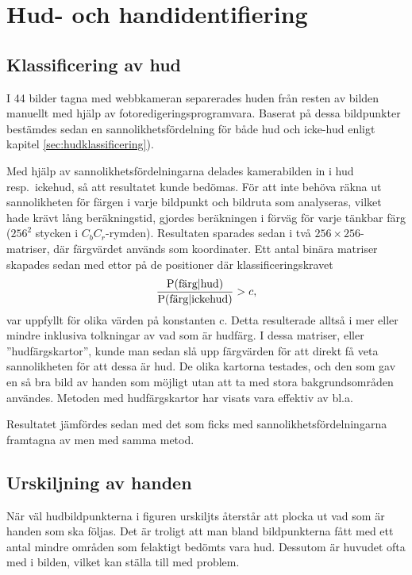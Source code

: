 \section{Hud- och handidentifiering}

\subsection{Klassificering av hud}
I 44 bilder tagna med webbkameran separerades huden från resten av
bilden manuellt med hjälp av fotoredigeringsprogramvara. Baserat på
dessa bildpunkter bestämdes sedan en sannolikhetsfördelning för både hud
och icke-hud enligt kapitel \ref{sec:hudklassificering}). 

Med hjälp av
sannolikhetsfördelningarna delades kamerabilden in i hud
resp.~ickehud, så att resultatet kunde bedömas. För att inte behöva
räkna ut sannolikheten för färgen i varje bildpunkt och bildruta
som analyseras,
vilket hade krävt lång beräkningstid, gjordes beräkningen
i förväg för varje tänkbar färg ($256^2$ stycken i
$C_bC_r$-rymden). Resultaten sparades
sedan i två $256\times256$-matriser, där färgvärdet används som
koordinater. Ett antal binära matriser skapades sedan med ettor på de
positioner där klassificeringskravet 
\begin{equation*}
	\frac{\mathrm{P}(\textrm{färg}|\textrm{hud})}{\mathrm{P}(\textrm{färg}|\textrm{ickehud})} > c,
\end{equation*}
var uppfyllt för olika värden på konstanten c. Detta resulterade alltså i mer
eller mindre inklusiva tolkningar av vad som är hudfärg. I dessa matriser, eller
''hudfärgskartor'', kunde man sedan slå upp
färgvärden för att direkt få veta sannolikheten för att dessa är
hud. 
De olika kartorna testades, och den som gav en så bra bild av
handen som möjligt utan att ta med stora bakgrundsområden användes.
Metoden med hudfärgskartor har visats vara effektiv av bl.a.~

Resultatet jämfördes sedan med det som ficks med
sannolikhetsfördelningarna framtagna av  men
med samma metod.

\subsection{Urskiljning av handen}\label{sec:metod_hud:urskiljning}

När väl hudbildpunkterna i figuren urskiljts återstår att plocka ut
vad som är handen som ska följas. Det är troligt att man bland
bildpunkterna fått med ett antal mindre områden som felaktigt bedömts vara
hud. Dessutom är huvudet ofta med i bilden, vilket kan ställa till med
problem. 

